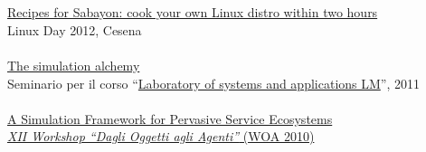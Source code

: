 \documentclass[10pt]{article}
\newcommand{\halfblankline}{\quad\vspace{-0.5\baselineskip}\pagebreak[3]}
\begin{document}
\\ \halfblankline \\
\href{https://www.slideshare.net/DanySK/recipes-for-sabayon-cook-your-own-linux-distro-within-two-hours}{Recipes for Sabayon: cook your own Linux distro within two hours} \\
Linux Day 2012, Cesena
\\ \halfblankline \\
\href{http://campus.unibo.it/83921/}{The simulation alchemy} \\
Seminario per il corso ``\href{http://apice.unibo.it/xwiki/bin/view/Courses/LsaLm1112}{Laboratory of systems and applications LM}'', 2011
\\ \halfblankline \\
\href{http://apice.unibo.it/xwiki/bin/view/Talks/PianiniWoa2011}{A Simulation Framework for Pervasive Service Ecosystems} \\
\href{http://www.inf.u-szeged.hu/projectdirs/saso10/}{\textit{XII Workshop ``Dagli Oggetti agli Agenti''} (WOA 2010)}
\end{document}
